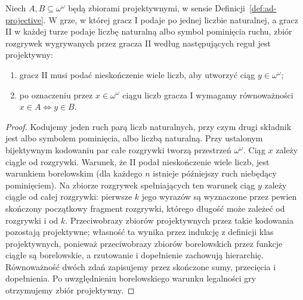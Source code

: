 \begin{lemat}
\label{lem:wadge-payoff-projective}
Niech $A,B\subseteq\omega^\omega$ będą zbiorami
projektywnymi, w sensie Definicji~\ref{def:ad-projective}.
W grze, w której gracz I podaje po jednej liczbie
naturalnej, a gracz II w każdej turze podaje liczbę
naturalną albo symbol pominięcia ruchu, zbiór
rozgrywek wygrywanych przez gracza II według
następujących reguł jest projektywny:
\begin{enumerate}
\item gracz II musi podać nieskończenie wiele liczb,
      aby utworzyć ciąg $y\in\omega^\omega$;
\item po oznaczeniu przez $x\in\omega^\omega$ ciągu
      liczb gracza I wymagamy równoważności
      $x\in A\iff y\in B$.
\end{enumerate}
\end{lemat}
\begin{proof}
Kodujemy jeden ruch parą liczb naturalnych,
przy czym drugi składnik jest albo symbolem pominięcia,
albo liczbą naturalną. Przy ustalonym bijektywnym
kodowaniu par całe rozgrywki tworzą przestrzeń
$\omega^\omega$. Ciąg $x$ zależy ciągle od rozgrywki.
Warunek, że II podał nieskończenie wiele liczb,
jest warunkiem borelowskim (dla każdego $n$ istnieje
późniejszy ruch niebędący pominięciem). Na zbiorze
rozgrywek spełniających ten warunek ciąg $y$ zależy
ciągle od całej rozgrywki: pierwsze $k$ jego wyrazów
są wyznaczone przez pewien skończony początkowy
fragment rozgrywki, którego długość może zależeć
od rozgrywki i od $k$. Przeciwobrazy zbiorów
projektywnych przez takie kodowania pozostają
projektywne; własność ta wynika przez indukcję
z definicji klas projektywnych, ponieważ przeciwobrazy
zbiorów borelowskich przez funkcje ciągłe są borelowskie,
a rzutowanie i dopełnienie zachowują hierarchię.
Równoważność dwóch zdań zapisujemy przez skończone
sumy, przecięcia i dopełnienia. Po uwzględnieniu
borelowskiego warunku legalności gry otrzymujemy
zbiór projektywny.
\end{proof}

